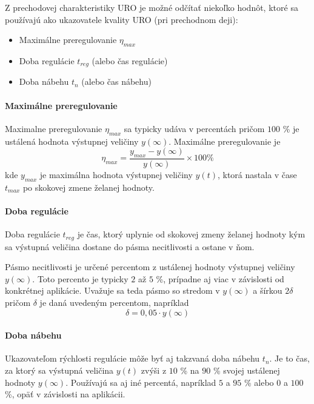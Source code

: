 \documentclass[a4paper, 10pt, ]{article}
\begin{document}
\noindent
Z prechodovej charakteristiky URO je možné odčítať niekoľko hodnôt, ktoré sa používajú ako ukazovatele kvality URO (pri prechodnom deji):

\begin{itemize}[leftmargin=0pt, labelsep=3mm, itemsep=0pt]
    \item Maximálne preregulovanie $\eta_{max}$
    \item Doba regulácie $t_{reg}$ (alebo čas regulácie)
    \item Doba nábehu $t_n$ (alebo čas nábehu)	
\end{itemize}

\paragraph{Maximálne preregulovanie}

Maximalne preregulovanie $\eta_{max}$ sa typicky udáva v percentách pričom $100$ \% je ustálená hodnota výstupnej veličiny $y(\infty)$. Maximálne preregulovanie je
\begin{equation}
    \eta_{max} = \frac{y_{max} - y(\infty)}{y(\infty)} \times 100 \%
\end{equation}
kde $y_{max}$ je maximálna hodnota výstupnej veličiny $y(t)$, ktorá nastala v čase $t_{max}$ po skokovej zmene želanej hodnoty.

\paragraph{Doba regulácie}

Doba regulácie $t_{reg}$ je čas, ktorý uplynie od skokovej zmeny želanej hodnoty kým sa výstupná veličina dostane do pásma necitlivosti a ostane v ňom.

Pásmo necitlivosti je určené percentom z ustálenej hodnoty výstupnej veličiny $y(\infty)$. Toto percento je typicky $2$ až $5$ \%, prípadne aj viac v závislosti od konkrétnej aplikácie. Uvažuje sa teda pásmo so stredom v $y(\infty)$ a šírkou $2 \delta$ pričom $\delta$ je daná uvedeným percentom, napríklad
\begin{equation}
    \delta = 0,05  \cdot y(\infty) 
\end{equation}

\paragraph{Doba nábehu}

Ukazovateľom rýchlosti regulácie môže byť aj takzvaná doba nábehu $t_n$. Je to čas, za ktorý sa výstupná veličina $y(t)$ zvýši z $10$ \% na $90$ \% svojej ustálenej hodnoty $y(\infty)$. Používajú sa aj iné percentá, napríklad $5$ a $95$ \% alebo $0$ a $100$ \%, opäť v závislosti na aplikácii.
\end{document}

